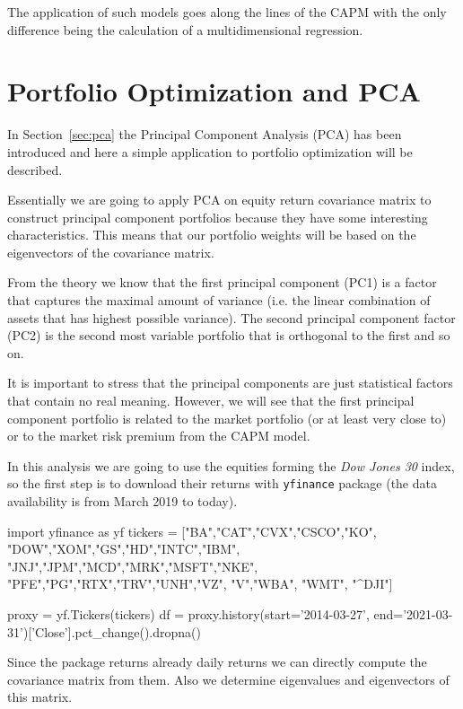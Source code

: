 The application of such models goes along the lines of the CAPM with the only difference being the calculation of a multidimensional regression.

\section{Portfolio Optimization and PCA}
\label{portfolio-optimization-and-pca}

In Section~\ref{sec:pca} the Principal Component Analysis (PCA) has been introduced and here a simple application to portfolio optimization will be described.

Essentially we are going to apply PCA on equity return covariance matrix to construct principal component portfolios because they have some interesting characteristics. This means that our portfolio weights will be based on the eigenvectors of the covariance matrix.

From the theory we know that the first principal component (PC1) is a factor that captures the maximal amount of variance (i.e. the linear combination of assets that has highest possible variance). The second principal component factor (PC2) is the second most variable portfolio that is orthogonal to the first and so on.

It is important to stress that the principal components are just statistical factors that contain no real meaning. However, we will see that the first principal component portfolio is related to the market portfolio (or at least very close to) or to the market risk premium from the CAPM model.

In this analysis we are going to use the equities forming the \emph{Dow Jones 30} index, so the first step is to download their returns with \texttt{yfinance} package (the data availability is from March 2019 to today).
	
\begin{ipython}
import yfinance as yf
tickers = ["BA","CAT","CVX","CSCO","KO",
           "DOW","XOM","GS","HD","INTC","IBM",
           "JNJ","JPM","MCD","MRK","MSFT","NKE",
           "PFE","PG","RTX","TRV","UNH","VZ",
           "V","WBA", "WMT", "^DJI"]

proxy = yf.Tickers(tickers)           
df = proxy.history(start='2014-03-27', end='2021-03-31')['Close'].pct_change().dropna()
\end{ipython}
	
Since the package returns already daily returns we can directly compute the covariance matrix from them. Also we determine eigenvalues and eigenvectors of this matrix.

